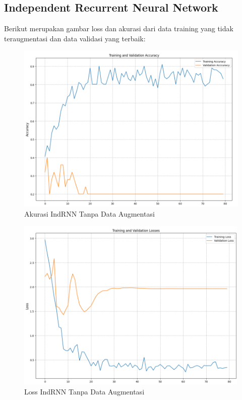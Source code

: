 \subsection{Independent Recurrent Neural Network}
Berikut merupakan gambar loss dan akurasi dari data training yang tidak teraugmentasi dan
data validasi yang terbaik:

\newpage
\begin{figure} [ht] \centering
  \includegraphics[scale=0.55]{gambar/AccIndRNNnoAug.png}
  \caption{Akurasi IndRNN Tanpa Data Augmentasi}
  \label{fig:AccIndRNNnoaug}
\end{figure}

\begin{figure} [ht] \centering
  \includegraphics[scale=0.55]{gambar/LossIndRNNnoAug.png}
  \caption{Loss IndRNN Tanpa Data Augmentasi}
  \label{fig:LossIndRNNnoaug}
\end{figure}

